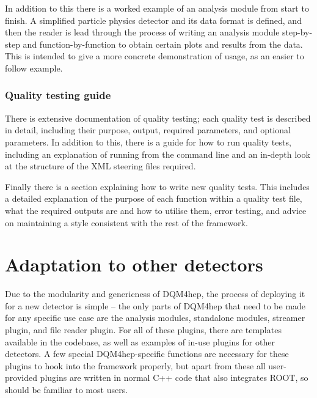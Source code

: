In addition to this there is a worked example of an analysis module from start to finish. A simplified particle physics detector and its data format is defined, and then the reader is lead through the process of writing an analysis module step-by-step and function-by-function to obtain certain plots and results from the data. This is intended to give a more concrete demonstration of usage, as an easier to follow example. %


\subsubsection*{Quality testing guide}
There is extensive documentation of quality testing; each quality test is described in detail, including their purpose, output, required parameters, and optional parameters. In addition to this, there is a guide for how to run quality tests, including an explanation of running from the command line and an in-depth look at the structure of the \acrshort{XML} steering files required.

Finally there is a section explaining how to write new quality tests. This includes a detailed explanation of the purpose of each function within a quality test file, what the required outputs are and how to utilise them, error testing, and advice on maintaining a style consistent with the rest of the framework.

\section{Adaptation to other detectors}
Due to the modularity and genericness of \acrshort{DQM4hep}, the process of deploying it for a new detector is simple -- the only parts of \acrshort{DQM4hep} that need to be made for any specific use case are the analysis modules, standalone modules, streamer plugin, and file reader plugin. For all of these plugins, there are templates available in the codebase, as well as examples of in-use plugins for other detectors. A few special \acrshort{DQM4hep}-specific functions are necessary for these plugins to hook into the framework properly, but apart from these all user-provided plugins are written in normal C++ code that also integrates ROOT, so should be familiar to most users.

